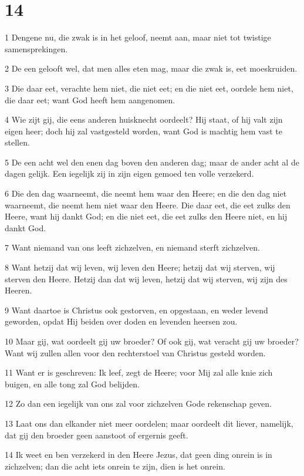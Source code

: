 \chapter{14}

\par 1 Dengene nu, die zwak is in het geloof, neemt aan, maar niet tot twistige samensprekingen.
\par 2 De een gelooft wel, dat men alles eten mag, maar die zwak is, eet moeskruiden.
\par 3 Die daar eet, verachte hem niet, die niet eet; en die niet eet, oordele hem niet, die daar eet; want God heeft hem aangenomen.
\par 4 Wie zijt gij, die eens anderen huisknecht oordeelt? Hij staat, of hij valt zijn eigen heer; doch hij zal vastgesteld worden, want God is machtig hem vast te stellen.
\par 5 De een acht wel den enen dag boven den anderen dag; maar de ander acht al de dagen gelijk. Een iegelijk zij in zijn eigen gemoed ten volle verzekerd.
\par 6 Die den dag waarneemt, die neemt hem waar den Heere; en die den dag niet waarneemt, die neemt hem niet waar den Heere. Die daar eet, die eet zulks den Heere, want hij dankt God; en die niet eet, die eet zulks den Heere niet, en hij dankt God.
\par 7 Want niemand van ons leeft zichzelven, en niemand sterft zichzelven.
\par 8 Want hetzij dat wij leven, wij leven den Heere; hetzij dat wij sterven, wij sterven den Heere. Hetzij dan dat wij leven, hetzij dat wij sterven, wij zijn des Heeren.
\par 9 Want daartoe is Christus ook gestorven, en opgestaan, en weder levend geworden, opdat Hij beiden over doden en levenden heersen zou.
\par 10 Maar gij, wat oordeelt gij uw broeder? Of ook gij, wat veracht gij uw broeder? Want wij zullen allen voor den rechterstoel van Christus gesteld worden.
\par 11 Want er is geschreven: Ik leef, zegt de Heere; voor Mij zal alle knie zich buigen, en alle tong zal God belijden.
\par 12 Zo dan een iegelijk van ons zal voor zichzelven Gode rekenschap geven.
\par 13 Laat ons dan elkander niet meer oordelen; maar oordeelt dit liever, namelijk, dat gij den broeder geen aanstoot of ergernis geeft.
\par 14 Ik weet en ben verzekerd in den Heere Jezus, dat geen ding onrein is in zichzelven; dan die acht iets onrein te zijn, dien is het onrein.
